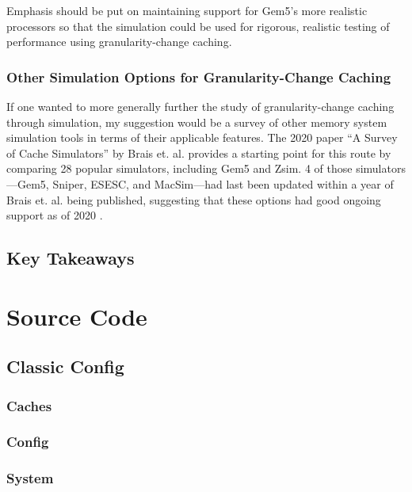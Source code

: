 \documentclass[12pt,twoside]{reedthesis}
\newcommand{\vstep}{\vspace{5mm}}
\begin{document}
	Emphasis should be put on maintaining support for Gem5's more realistic processors so that the simulation could be used for rigorous, realistic testing of performance using granularity-change caching.

	\subsection*{Other Simulation Options for Granularity-Change Caching}

	If one wanted to more generally further the study of granularity-change caching through simulation, my suggestion would be a survey of other memory system simulation tools in terms of their applicable features. The 2020 paper ``A Survey of Cache Simulators'' by Brais et. al. provides a starting point for this route by comparing 28 popular simulators, including Gem5 and Zsim. 4 of those simulators---Gem5, Sniper, ESESC, and MacSim---had last been updated within a year of Brais et. al. being published, suggesting that these options had good ongoing support as of 2020 \cite{brais}.

\section{Key Takeaways}

	
\appendix

\chapter{Source Code}

\section{Classic Config}

\subsection*{Caches}

\vstep

\subsection*{Config}

\vstep

\subsection*{System}

\vstep
\end{document}
